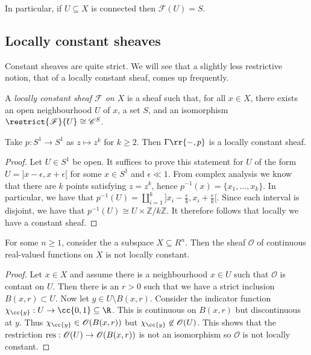 \documentclass{article}
\begin{document}
In particular, if $U\subseteq X$ is connected then $\mathscr F(U)=S$.

\subsection{Locally constant sheaves}

Constant sheaves are quite strict. We will see that a slightly less
restrictive notion, that of a locally constant sheaf, comes up
frequently.

\begin{definition}
  A \emph{locally constant sheaf $\mathscr F$ on $X$} is a sheaf such that, for
  all $x\in X$, there exists an open neighbourhood $U$ of $x$, a set $S$, and
  an isomorphism $\restrict{\mathscr F}{U} \cong \mathscr C^{S}$.
\end{definition}

\begin{example}
  \label{ex:locallyconstsheafs1}
  Take $p:S^1 \to S^1$ as $z\mapsto z^k$ for $k\geq 2$.
  Then $\Gamma\rr{-,p}$ is a locally constant sheaf.
  \begin{proof}
    Let $U \in S^1$ be open. It suffices to prove this statement for $U$ of the
    form $U = ]x - \epsilon, x + \epsilon[$ for some $x \in S^1$ and $\epsilon \ll 1$.
    From complex analysis we know that there are $k$ points satisfying $z = z^k$,
    hence $p^{-1}(x) = \{x_1, ..., x_k\}$. In particular, we have that
    $p^{-1}(U) = \amalg_{i=1}^k ]x_i - \frac{\epsilon}{k}, x_i + \frac{\epsilon}{k}[$.
    Since each interval is disjoint, we have that
    $p^{-1}(U) \cong U \times \mathbb{Z}/k\mathbb{Z}$.
    It therefore follows that locally we have a constant sheaf.
  \end{proof}
\end{example}

\begin{example}
  For some $n\geq 1$, consider the a subspace $X\subseteq R^n$.
  Then the sheaf $\mathscr O$ of continuous real-valued functions
  on $X$ is not locally constant.
  \begin{proof}
    Let $x\in X$ and assume there is a neighbourhood $x\in U$
    such that $\mathscr O$ is contant on $U$. Then there is
    an $r>0$ such that we have a strict inclusion $B(x,r)\subset U$.
    Now let $y\in U\setminus B(x,r)$. Consider the indicator
    function $\chi_{\cc{y}} : U \to \cc{0,1}\subseteq\R$. This is
    continuous on $B(x,r)$ but discontinuous at $y$. Thus
    $\chi_{\cc{y}} \in \mathscr O(B(x,r))$ but
    $\chi_{\cc{y}} \not\in\mathscr O(U)$. This shows
    that the restriction $\operatorname{res}:\mathscr O(U)\to \mathscr O(B(x,r))$
    is not an isomorphism so $\mathscr O$ is not locally constant.
  \end{proof}
\end{example}
\end{document}
